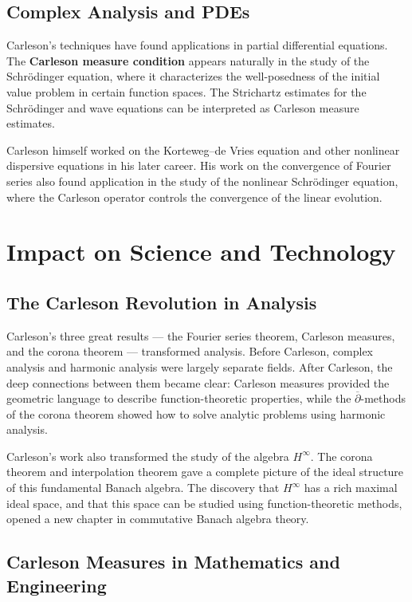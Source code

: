 \subsection{Complex Analysis and PDEs}

Carleson's techniques have found applications in partial differential equations. The \textbf{Carleson measure condition} appears naturally in the study of the Schr\"odinger equation, where it characterizes the well-posedness of the initial value problem in certain function spaces. The Strichartz estimates for the Schr\"odinger and wave equations can be interpreted as Carleson measure estimates.

Carleson himself worked on the Korteweg--de Vries equation and other nonlinear dispersive equations in his later career. His work on the convergence of Fourier series also found application in the study of the nonlinear Schr\"odinger equation, where the Carleson operator controls the convergence of the linear evolution.

\section{Impact on Science and Technology}

\subsection{The Carleson Revolution in Analysis}

Carleson's three great results --- the Fourier series theorem, Carleson measures, and the corona theorem --- transformed analysis. Before Carleson, complex analysis and harmonic analysis were largely separate fields. After Carleson, the deep connections between them became clear: Carleson measures provided the geometric language to describe function-theoretic properties, while the \(\overline{\partial}\)-methods of the corona theorem showed how to solve analytic problems using harmonic analysis.

Carleson's work also transformed the study of the algebra \(H^\infty\). The corona theorem and interpolation theorem gave a complete picture of the ideal structure of this fundamental Banach algebra. The discovery that \(H^\infty\) has a rich maximal ideal space, and that this space can be studied using function-theoretic methods, opened a new chapter in commutative Banach algebra theory.

\subsection{Carleson Measures in Mathematics and Engineering}

